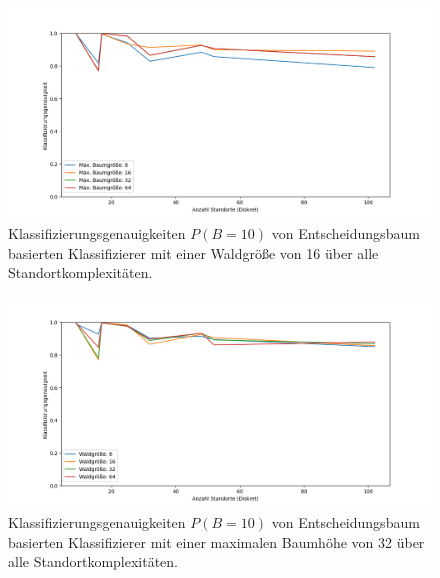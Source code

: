 \begin{figure}[h!]
    \centering
    \includegraphics[width=\linewidth]{images/multiple_best_by_group_dt_max_depth_acc_10_cont.png}
    \caption{Klassifizierungsgenauigkeiten $P(B=10)$ von Entscheidungsbaum basierten Klassifizierer mit einer Waldgröße von 16 über alle Standortkomplexitäten.}
    \label{fig:multiple_best_by_group_dt_max_depth_acc_10_cont}
\end{figure}

\begin{figure}[h!]
    \centering
    \includegraphics[width=\linewidth]{images/multiple_best_by_group_dt_trees_acc_10_cont.png}
    \caption{Klassifizierungsgenauigkeiten $P(B=10)$ von Entscheidungsbaum basierten Klassifizierer mit einer maximalen Baumhöhe von 32 über alle Standortkomplexitäten.}
    \label{fig:multiple_best_by_group_dt_trees_acc_10_cont}
\end{figure}

